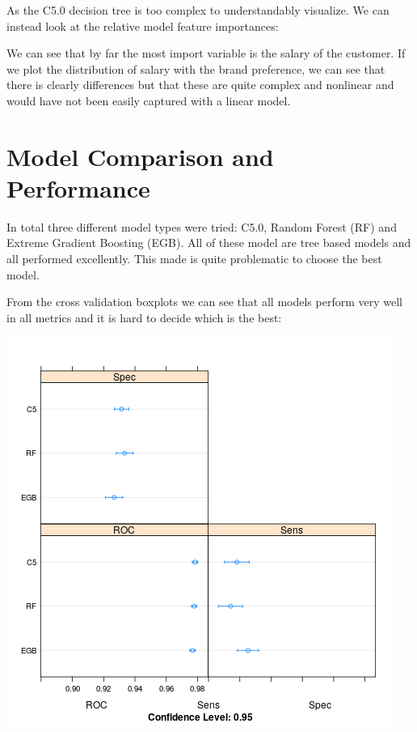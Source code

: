 \documentclass[12pt,a4paper,leqno]{report}
\theoremstyle{plain}
\theoremstyle{definition}
\theoremstyle{remark}
\begin{document}
As the C5.0 decision tree is too complex to understandably visualize. We can instead look at the
relative model feature importances:


We can see that by far the most import variable is the salary of the customer. If we plot the distribution
of salary with the brand preference, we can see that there is clearly differences but that these
are quite complex and nonlinear and would have not been easily captured with a linear model.

\section{Model Comparison and Performance}

In total three different model types were tried: C5.0, Random Forest (RF) and Extreme Gradient Boosting (EGB).
All of these model are tree based models and all performed excellently. This made is quite problematic
to choose the best model.

From the cross validation boxplots we can see that all models perform very well in all metrics and it is hard to
decide which is the best:

\bigskip
{
    \centering
    \includegraphics[width=\textwidth,height=\textheight,keepaspectratio]{dotplot_comparison.png}
    \par
}
\bigskip
\end{document}
